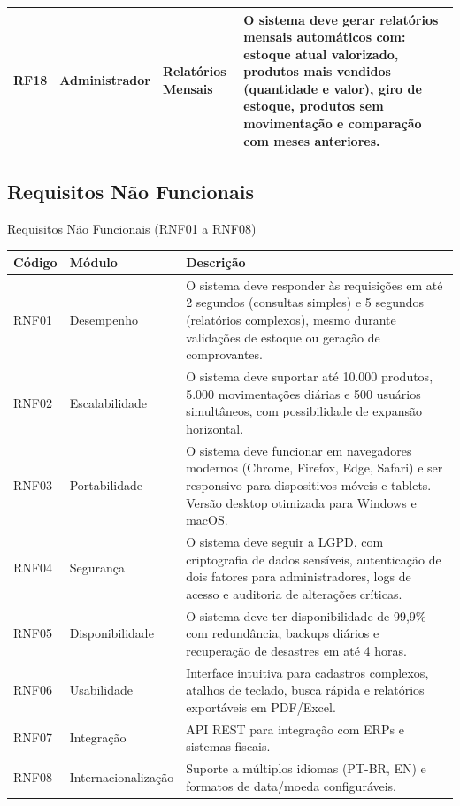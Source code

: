 \documentclass[
	12pt,				%
	openany,			%
	twoside,			%
	a4paper,			%
	english,			%
	brazil				%
	]{abntex2}
\begin{document}
\begin{quadro}[htb]
\begin{tabular}{|p{1.4cm}|p{2.8cm}|p{4.5cm}|p{7.0cm}|}
    RF18 & Administrador & Relatórios Mensais & O sistema deve gerar relatórios mensais automáticos com: estoque atual valorizado, produtos mais vendidos (quantidade e valor), giro de estoque, produtos sem movimentação e comparação com meses anteriores. \\ \hline

  

\end{tabular}
\end{quadro}

\FloatBarrier


\newpage
\subsection{Requisitos Não Funcionais}



\begin{quadro}[htb]
\caption{\label{quadro_rnf1}Requisitos Não Funcionais (RNF01 a RNF08)}
\begin{center}
\begin{tabular}{|p{2.2cm}|p{4.0cm}|p{10.0cm}|}
    \hline
    \textbf{Código} & \textbf{Módulo} & \textbf{Descrição} \\ \hline
    RNF01 & Desempenho & O sistema deve responder às requisições em até 2 segundos (consultas simples) e 5 segundos (relatórios complexos), mesmo durante validações de estoque ou geração de comprovantes. \\ \hline
    RNF02 & Escalabilidade & O sistema deve suportar até 10.000 produtos, 5.000 movimentações diárias e 500 usuários simultâneos, com possibilidade de expansão horizontal. \\ \hline
    RNF03 & Portabilidade & O sistema deve funcionar em navegadores modernos (Chrome, Firefox, Edge, Safari) e ser responsivo para dispositivos móveis e tablets. Versão desktop otimizada para Windows e macOS. \\ \hline
    RNF04 & Segurança & O sistema deve seguir a LGPD, com criptografia de dados sensíveis, autenticação de dois fatores para administradores, logs de acesso e auditoria de alterações críticas. \\ \hline
    RNF05 & Disponibilidade & O sistema deve ter disponibilidade de 99,9\% com redundância, backups diários e recuperação de desastres em até 4 horas. \\ \hline
    RNF06 & Usabilidade & Interface intuitiva para cadastros complexos, atalhos de teclado, busca rápida e relatórios exportáveis em PDF/Excel. \\ \hline
    RNF07 & Integração & API REST para integração com ERPs e sistemas fiscais. \\ \hline
    RNF08 & Internacionalização & Suporte a múltiplos idiomas (PT-BR, EN) e formatos de data/moeda configuráveis. \\ \hline
\end{tabular}
\end{center}
\end{quadro}
\end{document}
